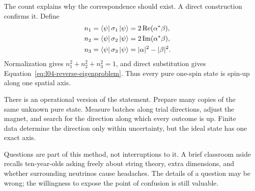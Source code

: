 \begin{classroomqa}
\end{classroomqa}

\begin{classroomqa}
\end{classroomqa}

The count explains why the correspondence should exist. A direct construction confirms it. Define
\begin{align}
  n_1&=\left\langle\psi\right\rvert\sigma_1\left\lvert\psi\right\rangle
      =2\operatorname{Re}(\alpha^*\beta),
  \notag\\
  n_2&=\left\langle\psi\right\rvert\sigma_2\left\lvert\psi\right\rangle
      =2\operatorname{Im}(\alpha^*\beta),
  \notag\\
  n_3&=\left\langle\psi\right\rvert\sigma_3\left\lvert\psi\right\rangle
      =|\alpha|^2-|\beta|^2.
  \label{eq:l04-bloch-components}
\end{align}
Normalization gives \(n_1^2+n_2^2+n_3^2=1\), and direct substitution gives Equation~\eqref{eq:l04-reverse-eigenproblem}. Thus every pure one-spin state is spin-up along one spatial axis.

There is an operational version of the statement. Prepare many copies of the same unknown pure state. Measure batches along trial directions, adjust the magnet, and search for the direction along which every outcome is up. Finite data determine the direction only within uncertainty, but the ideal state has one exact axis.

Questions are part of this method, not interruptions to it. A brief classroom aside recalls ten-year-olds asking freely about string theory, extra dimensions, and whether surrounding neutrinos cause headaches. The details of a question may be wrong; the willingness to expose the point of confusion is still valuable.

